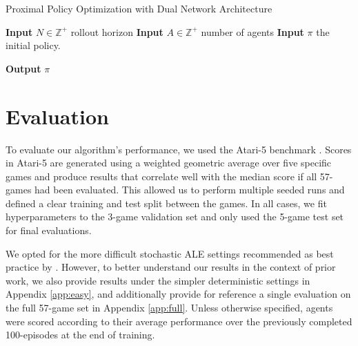 \documentclass{article}
\begin{document}
\begin{algorithm}[H]
    \caption{Proximal Policy Optimization with Dual Network Architecture}
    \label{alg:ppo_dna}
    \begin{algorithmic}[1]
    \State \textbf{Input} $N \in \mathbb{Z^+}$ rollout horizon
    \State \textbf{Input} $A \in \mathbb{Z^+}$ number of agents
    \State \textbf{Input} $\pi$ the initial policy.
        \EndFor
        
        
        
    
        \EndFor
    
        \EndFor
        
    
        \EndFor
    \EndFor
    \State \textbf{Output} $\pi$
    \EndProcedure
    \end{algorithmic}
\end{algorithm}


\section{Evaluation}
\label{sec:evaluation}





To evaluate our algorithm's performance, we used the Atari-5 benchmark \cite{aitchison2022atari}. Scores in Atari-5 are generated using a weighted geometric average over five specific games and produce results that correlate well with the median score if all 57-games had been evaluated. This allowed us to perform multiple seeded runs and defined a clear training and test split between the games. In all cases, we fit hyperparameters to the 3-game validation set and only used the 5-game test set for final evaluations. 

We opted for the more difficult stochastic ALE settings recommended as best practice by \cite{machado2018revisiting}. However, to better understand our results in the context of prior work, we also provide results under the simpler deterministic settings in Appendix \ref{app:easy}, and additionally provide for reference a single evaluation on the full 57-game set in Appendix \ref{app:full}. Unless otherwise specified, agents were scored according to their average performance over the previously completed 100-episodes at the end of training.
\end{document}
